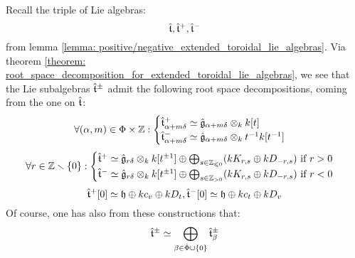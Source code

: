         \begin{corollary}
            Recall the triple of Lie algebras:
                $$\hat{\mathfrak{t}}, \hat{\mathfrak{t}}^+, \hat{\mathfrak{t}}^-$$
            from lemma \ref{lemma: positive/negative_extended_toroidal_lie_algebras}. Via theorem \ref{theorem: root_space_decomposition_for_extended_toroidal_lie_algebras}, we see that the Lie subalgebras $\hat{\mathfrak{t}}^{\pm}$ admit the following root space decompositions, coming from the one on $\hat{\mathfrak{t}}$:
                $$
                    \forall (\alpha, m) \in \Phi \x \Z:
                    \begin{cases}
                        \extendedtoroidal^+_{\alpha + m\delta} \cong \hat{\g}_{\alpha + m\delta} \tensor_{k} k[t]
                        \\
                        \extendedtoroidal^-_{\alpha + m\delta} \cong \hat{\g}_{\alpha + m\delta} \tensor_{k} t^{-1}k[t^{-1}]
                    \end{cases}
                $$
                $$
                    \forall r \in \Z \setminus \{0\}:
                    \begin{cases}
                        \text{$\extendedtoroidal^+ \cong \hat{\g}_{r\delta} \tensor_{k} k[t^{\pm 1}] \oplus \bigoplus_{s \in \Z_{\leq 0}} (k K_{r, s} \oplus k D_{-r, s})$ if $r > 0$}
                        \\
                        \text{$\extendedtoroidal^- \cong \hat{\g}_{r\delta} \tensor_{k} k[t^{\pm 1}] \oplus \bigoplus_{s \in \Z_{> 0}} (k K_{r, s} \oplus k D_{-r, s})$ if $r < 0$}
                    \end{cases}
                $$
                $$\hat{\mathfrak{t}}^+[0] \simeq \mathfrak{h} \oplus k c_v \oplus k D_t, \hat{\mathfrak{t}}^-[0] \simeq \mathfrak{h} \oplus k c_t \oplus k D_v$$
            Of course, one has also from these constructions that:
                $$\hat{\mathfrak{t}}^{\pm} \simeq \bigoplus_{\beta \in \hat{\Phi} \cup \{0\}} \hat{\mathfrak{t}}^{\pm}_{\beta}$$
        \end{corollary}
        
